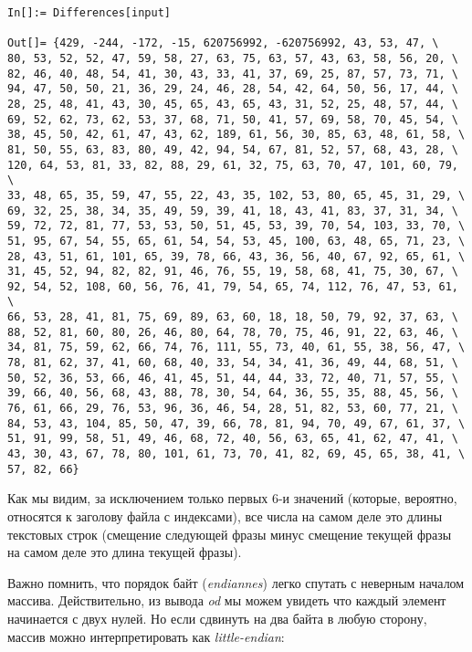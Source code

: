 \begin{lstlisting}[style=custommath]
In[]:= Differences[input]

Out[]= {429, -244, -172, -15, 620756992, -620756992, 43, 53, 47, \
80, 53, 52, 52, 47, 59, 58, 27, 63, 75, 63, 57, 43, 63, 58, 56, 20, \
82, 46, 40, 48, 54, 41, 30, 43, 33, 41, 37, 69, 25, 87, 57, 73, 71, \
94, 47, 50, 50, 21, 36, 29, 24, 46, 28, 54, 42, 64, 50, 56, 17, 44, \
28, 25, 48, 41, 43, 30, 45, 65, 43, 65, 43, 31, 52, 25, 48, 57, 44, \
69, 52, 62, 73, 62, 53, 37, 68, 71, 50, 41, 57, 69, 58, 70, 45, 54, \
38, 45, 50, 42, 61, 47, 43, 62, 189, 61, 56, 30, 85, 63, 48, 61, 58, \
81, 50, 55, 63, 83, 80, 49, 42, 94, 54, 67, 81, 52, 57, 68, 43, 28, \
120, 64, 53, 81, 33, 82, 88, 29, 61, 32, 75, 63, 70, 47, 101, 60, 79, \
33, 48, 65, 35, 59, 47, 55, 22, 43, 35, 102, 53, 80, 65, 45, 31, 29, \
69, 32, 25, 38, 34, 35, 49, 59, 39, 41, 18, 43, 41, 83, 37, 31, 34, \
59, 72, 72, 81, 77, 53, 53, 50, 51, 45, 53, 39, 70, 54, 103, 33, 70, \
51, 95, 67, 54, 55, 65, 61, 54, 54, 53, 45, 100, 63, 48, 65, 71, 23, \
28, 43, 51, 61, 101, 65, 39, 78, 66, 43, 36, 56, 40, 67, 92, 65, 61, \
31, 45, 52, 94, 82, 82, 91, 46, 76, 55, 19, 58, 68, 41, 75, 30, 67, \
92, 54, 52, 108, 60, 56, 76, 41, 79, 54, 65, 74, 112, 76, 47, 53, 61, \
66, 53, 28, 41, 81, 75, 69, 89, 63, 60, 18, 18, 50, 79, 92, 37, 63, \
88, 52, 81, 60, 80, 26, 46, 80, 64, 78, 70, 75, 46, 91, 22, 63, 46, \
34, 81, 75, 59, 62, 66, 74, 76, 111, 55, 73, 40, 61, 55, 38, 56, 47, \
78, 81, 62, 37, 41, 60, 68, 40, 33, 54, 34, 41, 36, 49, 44, 68, 51, \
50, 52, 36, 53, 66, 46, 41, 45, 51, 44, 44, 33, 72, 40, 71, 57, 55, \
39, 66, 40, 56, 68, 43, 88, 78, 30, 54, 64, 36, 55, 35, 88, 45, 56, \
76, 61, 66, 29, 76, 53, 96, 36, 46, 54, 28, 51, 82, 53, 60, 77, 21, \
84, 53, 43, 104, 85, 50, 47, 39, 66, 78, 81, 94, 70, 49, 67, 61, 37, \
51, 91, 99, 58, 51, 49, 46, 68, 72, 40, 56, 63, 65, 41, 62, 47, 41, \
43, 30, 43, 67, 78, 80, 101, 61, 73, 70, 41, 82, 69, 45, 65, 38, 41, \
57, 82, 66}
\end{lstlisting}

Как мы видим, за исключением только первых 6-и значений
(которые, вероятно, относятся к заголову файла с индексами),
все числа на самом деле это длины текстовых строк
(смещение следующей фразы минус смещение текущей фразы на самом деле это длина текущей фразы).

Важно помнить, что порядок байт (\emph{endiannes}) легко спутать с неверным началом массива.
Действительно, из вывода \emph{od} мы можем увидеть что каждый элемент начинается с двух нулей.
Но если сдвинуть на два байта в любую сторону, массив можно интерпретировать как \emph{little-endian}:

